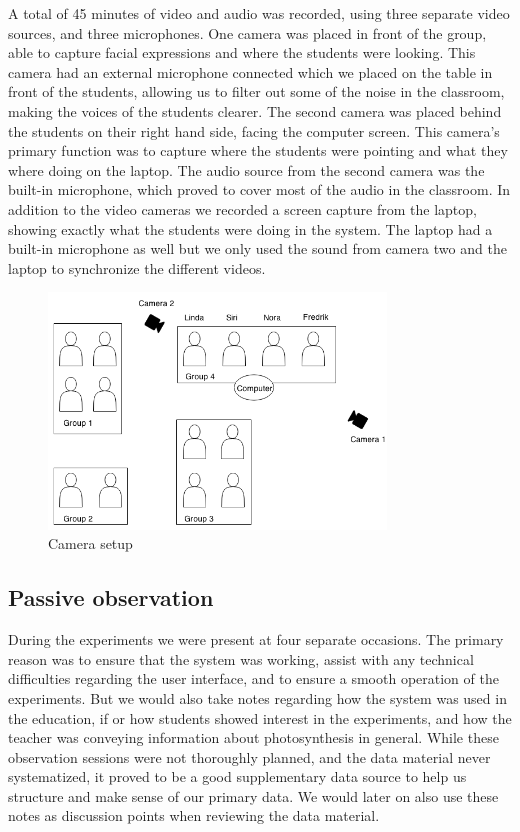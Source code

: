 A total of 45 minutes of video and audio was recorded, using three separate video sources, and three microphones. One camera was placed in front of the group, able to capture facial expressions and where the students were looking. This camera had an external microphone connected which we placed on the table in front of the students, allowing us to filter out some of the noise in the classroom, making the voices of the students clearer. The second camera was placed behind the students on their right hand side, facing the computer screen. This camera's primary function was to capture where the students were pointing and what they where doing on the laptop. The audio source from the second camera was the built-in microphone, which proved to cover most of the audio in the classroom. In addition to the video cameras we recorded a screen capture from the laptop, showing exactly what the students were doing in the system. The laptop had a built-in microphone as well but we only used the sound from camera two and the laptop to synchronize the different videos.
\begin{figure}
\centering
\includegraphics[width=0.8\textwidth]{img/empiricalsetting/class_diagram.png}
\caption{Camera setup}
\label{fig:camerasetup}
\end{figure}

\subsection{Passive observation}
During the experiments we were present at four separate occasions. The primary reason was to ensure that the system was working, assist with any technical difficulties regarding the user interface, and to ensure a smooth operation of the experiments. But we would also take notes regarding how the system was used in the education, if or how students showed interest in the experiments, and how the teacher was conveying information about photosynthesis in general. While these observation sessions were not thoroughly planned, and the data material never systematized, it proved to be a good supplementary data source to help us structure and make sense of our primary data. We would later on also use these notes as discussion points when reviewing the data material. 


